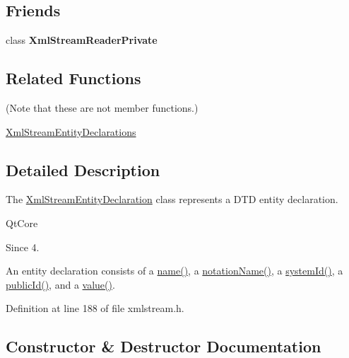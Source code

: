 \subsection*{Friends}
\begin{DoxyCompactItemize}
\item 
\mbox{\label{class_xml_stream_entity_declaration_a07cbe8adea255c3bb802811c3872de83}} 
class {\bfseries Xml\+Stream\+Reader\+Private}
\end{DoxyCompactItemize}
\subsection*{Related Functions}
(Note that these are not member functions.) \begin{DoxyCompactItemize}
\item 
\hyperlink{class_xml_stream_entity_declaration_a49950c9d3e6d666bc5516775fe3a8d80}{Xml\+Stream\+Entity\+Declarations}
\end{DoxyCompactItemize}


\subsection{Detailed Description}
The \hyperlink{class_xml_stream_entity_declaration}{Xml\+Stream\+Entity\+Declaration} class represents a D\+TD entity declaration. 

Qt\+Core \begin{DoxySince}{Since}
4. 
\end{DoxySince}
An entity declaration consists of a \hyperlink{class_xml_stream_entity_declaration_a9a80e6de9668c14886616062cf61b247}{name()}, a \hyperlink{class_xml_stream_entity_declaration_a4f3ded710f79c36222a4b1abff30a70b}{notation\+Name()}, a \hyperlink{class_xml_stream_entity_declaration_a10c98ee5aa7f0c64d531db9674c8d981}{system\+Id()}, a \hyperlink{class_xml_stream_entity_declaration_a94f13960262228875b5a6def3fdb7325}{public\+Id()}, and a \hyperlink{class_xml_stream_entity_declaration_aeea2611b6e86540eb5d41486e001c03f}{value()}. 

Definition at line 188 of file xmlstream.\+h.



\subsection{Constructor \& Destructor Documentation}
\mbox{\label{class_xml_stream_entity_declaration_a84512094bb6fff3e9878e392942b796d}} 
